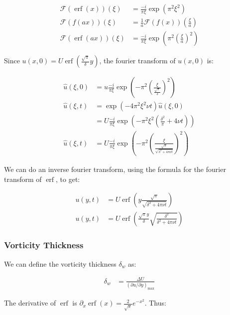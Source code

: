 \documentclass{article}
\DeclareMathOperator\erf{erf}
\begin{document}
\begin{align}
\mathcal{F}(\erf(x))(\xi) & = 
	\frac{-i}{\pi \xi} \exp \left(\pi^2 \xi^2 \right)\\
\mathcal{F}(f(a x))(\xi) & = 
	\frac{1}{a} \mathcal{F}(f(x))\left(\frac{\xi}{a}\right)\\
\mathcal{F}(\erf(a x))(\xi) & =
	\frac{-i}{\pi \xi} \exp \left(\pi^2 
		\left( \frac{\xi}{a} \right)^2 \right)
\end{align}

Since $u(x,0) = U \erf \left( \frac{\sqrt{\pi}}{\delta} y \right) $,
	the fourier transform of $u(x, 0)$ is:

\begin{align}
\hat{u}(\xi, 0) & = u
	\frac{- i }{\pi \xi}\exp \left(-\pi^2 
		\left( \frac{\xi}{\frac{\sqrt{\pi}}{\delta}} \right)^2 \right)\\
\hat{u}(\xi, t) & = 
	\exp \left( - 4 \pi^2 \xi^2 \nu t \right) \hat{u}(\xi, 0) \nonumber \\
& = U
	\frac{- i }{\pi \xi}\exp \left(-\pi^2 \xi^2 
		\left( \frac{\delta^2}{\pi}
		+ 4 \nu t \right) \right) \nonumber\\
\hat{u}(\xi, t) &  = U \frac{- i}{\pi \xi} 
	\exp\left(- \pi^2 \left( \frac{\xi}{\frac{\sqrt{\pi}}{
	\sqrt{\delta^2 + 4 \pi \nu t}}} \right)^2 \right)
\end{align}

We can do an inverse fourier transform, using the formula for the fourier
	transform of $\erf$, to get:

\begin{align}
u(y,t) & = U \erf \left( y \frac{\sqrt{\pi}}
	{\sqrt{\delta^2 + 4 \pi \nu t}} \right) \nonumber \\
u(y,t) & = U \erf \left( \frac{ \sqrt{\pi} y}{\delta} 
	\sqrt{ \frac{\delta^2}{\delta^2 + 4 \pi \nu t}} \right) 
\end{align}

\subsubsection{Vorticity Thickness}

We can define the vorticity thickness $\delta_w$ as:

\begin{align}
\delta_w & = \frac{\Delta U}{\left( \partial u / \partial y \right)_\text{max}}
\end{align}

The derivative of $\erf$ is $\partial_x \erf(x) 
	= \frac{2}{\sqrt{\pi}} e^{-x^2}$.
Thus:
\end{document}
